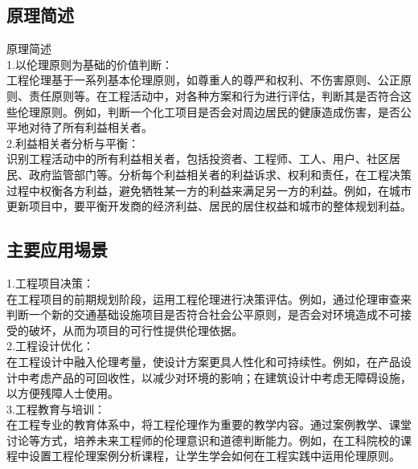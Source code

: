 \documentclass[supercite]{Experimental_Report}
\theoremstyle{definition}
\begin{document}
	\subsection{原理简述}
	原理简述\\
	1.以伦理原则为基础的价值判断：\\工程伦理基于一系列基本伦理原则，如尊重人的尊严和权利、不伤害原则、公正原则、责任原则等。在工程活动中，对各种方案和行为进行评估，判断其是否符合这些伦理原则。例如，判断一个化工项目是否会对周边居民的健康造成伤害，是否公平地对待了所有利益相关者。\\
	2.利益相关者分析与平衡：\\识别工程活动中的所有利益相关者，包括投资者、工程师、工人、用户、社区居民、政府监管部门等。分析每个利益相关者的利益诉求、权利和责任，在工程决策过程中权衡各方利益，避免牺牲某一方的利益来满足另一方的利益。例如，在城市更新项目中，要平衡开发商的经济利益、居民的居住权益和城市的整体规划利益。
	\subsection{主要应用埸景}
	1.工程项目决策：\\在工程项目的前期规划阶段，运用工程伦理进行决策评估。例如，通过伦理审查来判断一个新的交通基础设施项目是否符合社会公平原则，是否会对环境造成不可接受的破坏，从而为项目的可行性提供伦理依据。\\
	2.工程设计优化：\\在工程设计中融入伦理考量，使设计方案更具人性化和可持续性。例如，在产品设计中考虑产品的可回收性，以减少对环境的影响；在建筑设计中考虑无障碍设施，以方便残障人士使用。\\
	3.工程教育与培训：\\在工程专业的教育体系中，将工程伦理作为重要的教学内容。通过案例教学、课堂讨论等方式，培养未来工程师的伦理意识和道德判断能力。例如，在工科院校的课程中设置工程伦理案例分析课程，让学生学会如何在工程实践中运用伦理原则。
	
\end{document}
